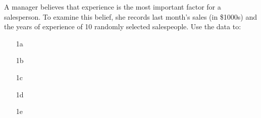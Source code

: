 A manager believes that experience is the most important factor for a salesperson. To examine this
belief, she records last month's sales (in \$1000s) and the years of experience of 10 randomly selected
salespeople. Use the data to:

\begin{enumerate}

    \item[1a] 
    \pagebreak
    \item[1b] 
    \pagebreak
    \item[1c] 
    \pagebreak
    \item[1d] 
    \pagebreak
    \item[1e] 
 
\end{enumerate} 